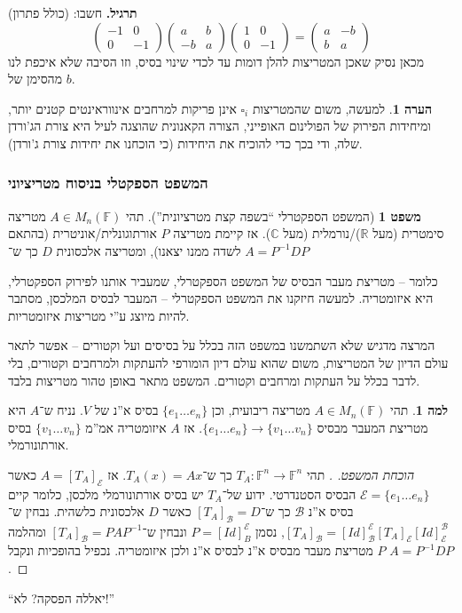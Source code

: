\documentclass[a4paper]{article}
\newcommand\R     {\mathbb{R}}
\newcommand\C     {\mathbb{C}}
\newcommand\bc    {\mathcal{B}}
\newcommand\ec    {\mathcal{E}}
\newcommand\F         {\mathbb{F}}
\newcommand\co        {\colon}
\newcommand\pms[1]    {\begin{pmatrix}
		#1
\end{pmatrix}}
\newcommand\op    {^{-1}}
\theoremstyle{definition}
\newtheorem{Theorem}{\color{myblue}משפט}
\newtheorem{Lemma}{\color{myyellow}למה}
\newtheorem{Remark}{\color{mycyan}הערה}
\newcommand\rmark [1] {\begin{Remark}#1\end{Remark}}
\newcommand\lem   [1] {\begin{Lemma}#1\end{Lemma}}
\begin{document}
	\textbf{תרגיל. }חשבו: (כולל פתרון)
	\[ \pms{-1 & 0 \\ 0 & -1}\pms{a & b \\ -b & a}\pms{1 & 0 \\ 0 & -1} = \pms{a & -b \\ b & a} \]
	מכאן נסיק שאכן המטריצות להלן דומות עד לכדי שינוי בסיס, וזו הסיבה שלא איכפת לנו מהסימן של $b$. 
	
	\rmark{למעשה, משום שהמטריצות $\square_i$ אינן פריקות למרחבים אינווראינטים קטנים יותר, ומיחידות הפירוק של הפולינום האופייני, הצורה הקאנונית שהוצגה לעיל היא צורת הג'ורדן שלה, ודי בכך כדי להוכיח את היחידות (כי הוכחנו את יחידות צורת ג'ורדן). }
	
	\subsubsection{המשפט הספקטלי בניסוח מטריציוני}
	\begin{Theorem}[המשפט הספקטרלי ``בשפה קצת מטרציונית'']
		תהי $A \in M_n(\F)$ מטריצה סימטרית (מעל $\R$)/נורמלית (מעל $\C$). אז קיימת  מטריצה $P$ אורתוגונלית/אוניטרית (בהתאם לשדה ממנו יצאנו), ומטריצה אלכסונית $D$ כך ש־
		$ A = P\op D P $
	\end{Theorem}
	כלומר – מטריצת מעבר הבסיס של המשפט הספקטרלי, שמעביר אותנו לפירוק הספקטרלי, היא איזומטריה. למעשה חיזקנו את המשפט הספקטרלי – המעבר לבסיס המלכסן, מסתבר להיות מיוצג ע''י מטריצות איזומטריות. 
	
	המרצה מדגיש שלא השתמשנו במשפט הזה בכלל על בסיסים ועל וקטורים – אפשר לתאר עולם הדיון של המטריצות, משום שהוא עולם דיון הומורפי להעתקות ולמרחבים וקטורים, בלי לדבר בכלל על העתקות ומרחבים וקטורים. המשפט מתאר באופן טהור מטריצות בלבד. 
	
	\lem{תהי $A \in M_n(\F)$ מטריצה ריבועית, וכן $\{e_1 \dots e_n\}$ בסיס א''נ של $V$. נניח ש־$A$ היא מטריצת המעבר מבסיס $\{e_1 \dots e_n\} \to \{v_1 \dots v_n\}$. אז $A$ איזומטריה אמ''מ $\{v_1 \dots v_n\}$ בסיס אורתונורמלי. }
	\begin{proof}[הוכחת המשפט. ]
		תהי $T_A \co \F^n \to \F^n$ כך ש־$T_A(x) = Ax$. אז $A= [T_A]_\ec$ כאשר $\ec = \{e_1 \dots e_n\}$ הבסיס הסטנדרטי. ידוע של־$T_A$ יש בסיס אורתונורמלי מלכסן, כלומר קיים בסיס א''נ $\bc$ כך ש־$[T_A]_\bc = D$ כאשר $D$ אלכסונית כלשהית. נבחין ש־$[T_A]_\bc = [Id]^\ec_\bc [T_A]_\ec [Id]_\ec^\bc$, נסמן $P = [Id]^\ec_B$ ונבחין ש־$[T_A]_\bc = PAP\op$ ומהלמה $P$ מטריצת מעבר מבסיס א''נ לבסיס א''נ ולכן איזומטריה. נכפיל בהופכיות ונקבל $A = P\op DP$. 
	\end{proof}
	
	``יאללה הפסקה? לא!''
	
\end{document}
